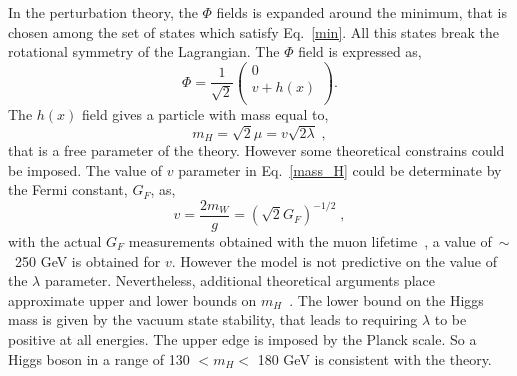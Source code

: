 In the perturbation theory, the $\Phi$ fields is expanded around the minimum, that is chosen among the set of states which satisfy Eq.~\ref{min}. All this states break the rotational symmetry of the Lagrangian.
The $\Phi$ field is expressed as, 
\begin{equation}
\Phi= \frac{1}{\sqrt{2}} 
\left(
\begin{array}{c}
0   \\
v +h(x) \\
\end{array}
\right) .
\end{equation}
The $h(x)$ field gives a particle with mass equal to,
\begin{equation}
m_H=\sqrt{2}\mu=v\sqrt{2 \lambda} \; ,
\label{mass_H}
\end{equation}
that is a free parameter of the theory. However some theoretical constrains could be imposed. The value of $v$ parameter in Eq.~\ref{mass_H} could be determinate by the Fermi constant, $G_F$, as,
\begin{equation}
v=\frac{2m_W}{g}=(\sqrt{2} G_F)^{-1/2} \; ,
\end{equation}
with the actual $G_F$ measurements obtained with the muon lifetime~\cite{vanRitbergen:1999fi}, a value  of~$\sim$~250 GeV is obtained for  $v$. However the  model is not predictive on the value of the $\lambda$ parameter. Nevertheless, additional theoretical arguments place approximate upper and
lower bounds on $m_H$~\cite{Beringer:1900zz}. The lower bound on the Higgs mass is given by  the vacuum state stability, that leads to requiring $\lambda$ to be
positive at all energies. The upper edge is imposed by the Planck scale. So a Higgs boson in a range of 130 $<m_H<$ 180 GeV is consistent with the theory.
 
